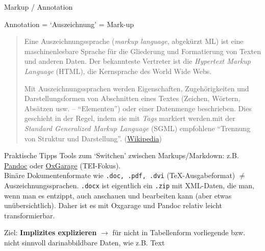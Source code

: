 \begin{frame}{Markup / Annotation}

\begin{exampleblock}{Annotation = `Auszeichnung' = Mark-up}
\begin{quote}
Eine Auszeichnungssprache (\emph{markup language}, abgekürzt ML) ist eine maschinenlesbare Sprache für die Gliederung und Formatierung von Texten und anderen Daten. Der bekannteste Vertreter ist die \emph{Hypertext Markup Language} (HTML), die Kernsprache des World Wide Webs.

Mit Auszeichnungssprachen werden Eigenschaften, Zugehörigkeiten und Darstellungsformen von Abschnitten eines Textes (Zeichen, Wörtern, Absätzen usw. -- ``Elementen'') oder einer Datenmenge beschrieben. Dies geschieht in der Regel, indem sie mit \emph{Tags} markiert werden.\punkti mit der \emph{Standard Generalized Markup Language} (SGML) empfohlene ``Trennung von Struktur und Darstellung''. (\href{https://de.wikipedia.org/wiki/Auszeichnungssprache}{Wikipedia})
\end{quote}
\end{exampleblock}
\end{frame}

\begin{frame}{Praktische Tipps}
 Tools zum `Switchen' zwischen Markups/Markdown: 
 z.B.~ \href{https://pandoc.org/}{Pandoc} oder \href{http://oxgarage.tei-c.org}{OxGarage} (TEI-Fokus). \\

Binäre Dokumentenformate  wie \texttt{.doc, .pdf, .dvi} (\TeX{}-Ausgabeformat) $\neq$ Auszeichnungssprachen. \texttt{.docx} ist eigentlich ein \texttt{.zip} mit XML-Daten, die man, wenn man es entzippt, auch anschauen und bearbeiten kann (aber etwas unübersichtlich). Daher ist es mit Oxgarage und Pandoc relativ leicht transformierbar.

Ziel: \textbf{Implizites explizieren} $\to$ für nicht in Tabellenform vorliegende bzw. nicht sinnvoll darinabbildbare Daten, wie z.B. Text
\end{frame}





